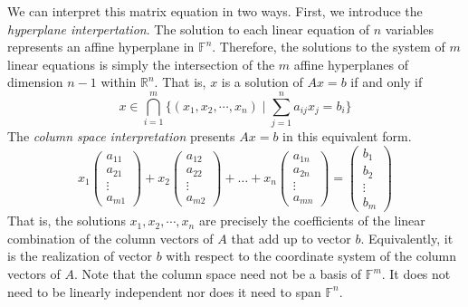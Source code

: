   We can interpret this matrix equation in two ways. First, we introduce the \textit{hyperplane interpertation}. The solution to each linear equation of $n$ variables represents an affine hyperplane in $\mathbb{F}^n$. Therefore, the solutions to the system of $m$ linear equations is simply the intersection of the $m$ affine hyperplanes of dimension $n-1$ within $\mathbb{R}^n$. That is, $x$ is a solution of $A x = b$ if and only if  
  \begin{equation}
    x \in \bigcap_{i = 1}^m \Big\{ (x_1, x_2, \cdots, x_n) \; | \; \sum_{j = 1}^n a_{i j} x_j = b_i \Big\}
  \end{equation}
  The \textit{column space interpretation} presents $A x = b$ in this equivalent form. 
  \begin{equation}
    x_1 \begin{pmatrix}
    a_{1 1} \\ a_{2 1} \\ \vdots \\ a_{m 1}
    \end{pmatrix} + x_2 \begin{pmatrix}
    a_{1 2} \\ a_{2 2} \\ \vdots \\ a_{m 2}
    \end{pmatrix} + \ldots + x_n \begin{pmatrix}
    a_{1 n} \\ a_{2 n} \\ \vdots \\ a_{m n}
    \end{pmatrix} = \begin{pmatrix}
    b_1 \\ b_2 \\ \vdots \\ b_m
    \end{pmatrix}
  \end{equation}
  That is, the solutions $x_1, x_2, \cdots, x_n$ are precisely the coefficients of the linear combination of the column vectors of $A$ that add up to vector $b$. Equivalently, it is the realization of vector $b$ with respect to the coordinate system of the column vectors of $A$. Note that the column space need not be a basis of $\mathbb{F}^m$. It does not need to be linearly independent nor does it need to span $\mathbb{F}^n$. 

